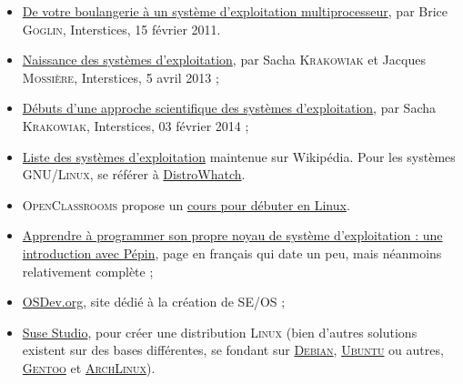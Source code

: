\begin{gofurther}[after skip=2pt]
\textsc{}
\begin{itemize}\jazzitem
\item \href{https://interstices.info/de-votre-boulangerie-a-un-systeme-dexploitation-multiprocesseur/}{De votre boulangerie à un système d'exploitation multiprocesseur}, par Brice \textsc{Goglin}, Interstices, 15 février 2011.
\end{itemize}

\smallskip
\textsc{}
\begin{itemize}\jazzitem
\item \href{https://interstices.info/la-naissance-des-systemes-dexploitation/}{Naissance des systèmes d'exploitation}, par Sacha \textsc{Krakowiak} et Jacques \textsc{Mossière}, Interstices, 5 avril 2013 ;
\item \href{https://interstices.info/les-debuts-dune-approche-scientifique-des-systemes-dexploitation/}{Débuts d’une approche scientifique des systèmes d’exploitation}, par Sacha \textsc{Krakowiak}, Interstices, 03 février 2014 ;
\item \href{https://fr.wikipedia.org/wiki/Liste_des_syst\%C3\%A8mes_d\%27exploitation}{Liste des systèmes d'exploitation} maintenue sur Wikipédia. Pour les systèmes \textsc{GNU/Linux}, se référer à \href{https://distrowatch.com/}{DistroWhatch}.
\end{itemize}

\smallskip
\textsc{}
\begin{itemize}\jazzitem
\item \textsc{OpenClassrooms} propose un \href{https://openclassrooms.com/fr/courses/43538-reprenez-le-controle-a-laide-de-linux}{cours pour débuter en Linux}.
\end{itemize}

\smallskip
\textsc{}
\begin{itemize}\jazzitem
\item \href{http://a.michelizza.free.fr/}{Apprendre à programmer son propre noyau de système d'exploitation : une introduction avec Pépin}, page en français qui date un peu, mais néanmoins relativement complète ;
\item \href{https://wiki.osdev.org/Main_Page}{OSDev.org}, site dédié à la création de SE/OS ;
\item \href{https://studioexpress.opensuse.org/}{Suse Studio}, pour créer une distribution \textsc{Linux} (bien d'autres solutions existent sur des bases différentes, se fondant sur \href{https://www.debian.org/index.fr.html}{\textsc{Debian}}, \href{https://ubuntu.com/}{\textsc{Ubuntu}} ou autres, \href{https://www.gentoo.org/}{\textsc{Gentoo}} et \href{https://www.archlinux.org/}{\textsc{ArchLinux}}).
\end{itemize}
\end{gofurther}


